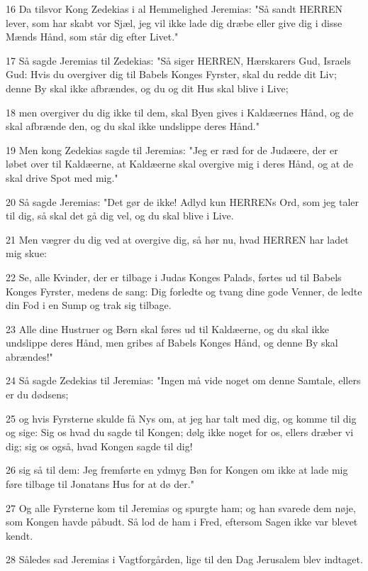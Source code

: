 \par 16 Da tilsvor Kong Zedekias i al Hemmelighed Jeremias: "Så sandt HERREN lever, som har skabt vor Sjæl, jeg vil ikke lade dig dræbe eller give dig i disse Mænds Hånd, som står dig efter Livet."
\par 17 Så sagde Jeremias til Zedekias: "Så siger HERREN, Hærskarers Gud, Israels Gud: Hvis du overgiver dig til Babels Konges Fyrster, skal du redde dit Liv; denne By skal ikke afbrændes, og du og dit Hus skal blive i Live;
\par 18 men overgiver du dig ikke til dem, skal Byen gives i Kaldæernes Hånd, og de skal afbrænde den, og du skal ikke undslippe deres Hånd."
\par 19 Men kong Zedekias sagde til Jeremias: "Jeg er ræd for de Judæere, der er løbet over til Kaldæerne, at Kaldæerne skal overgive mig i deres Hånd, og at de skal drive Spot med mig."
\par 20 Så sagde Jeremias: "Det gør de ikke! Adlyd kun HERRENs Ord, som jeg taler til dig, så skal det gå dig vel, og du skal blive i Live.
\par 21 Men vægrer du dig ved at overgive dig, så hør nu, hvad HERREN har ladet mig skue:
\par 22 Se, alle Kvinder, der er tilbage i Judas Konges Palads, førtes ud til Babels Konges Fyrster, medens de sang: Dig forledte og tvang dine gode Venner, de ledte din Fod i en Sump og trak sig tilbage.
\par 23 Alle dine Hustruer og Børn skal føres ud til Kaldæerne, og du skal ikke undslippe deres Hånd, men gribes af Babels Konges Hånd, og denne By skal abrændes!"
\par 24 Så sagde Zedekias til Jeremias: "Ingen må vide noget om denne Samtale, ellers er du dødsens;
\par 25 og hvis Fyrsterne skulde få Nys om, at jeg har talt med dig, og komme til dig og sige: Sig os hvad du sagde til Kongen; dølg ikke noget for os, ellers dræber vi dig; sig os også, hvad Kongen sagde til dig!
\par 26 sig så til dem: Jeg fremførte en ydmyg Bøn for Kongen om ikke at lade mig føre tilbage til Jonatans Hus for at dø der."
\par 27 Og alle Fyrsterne kom til Jeremias og spurgte ham; og han svarede dem nøje, som Kongen havde påbudt. Så lod de ham i Fred, eftersom Sagen ikke var blevet kendt.
\par 28 Således sad Jeremias i Vagtforgården, lige til den Dag Jerusalem blev indtaget.

